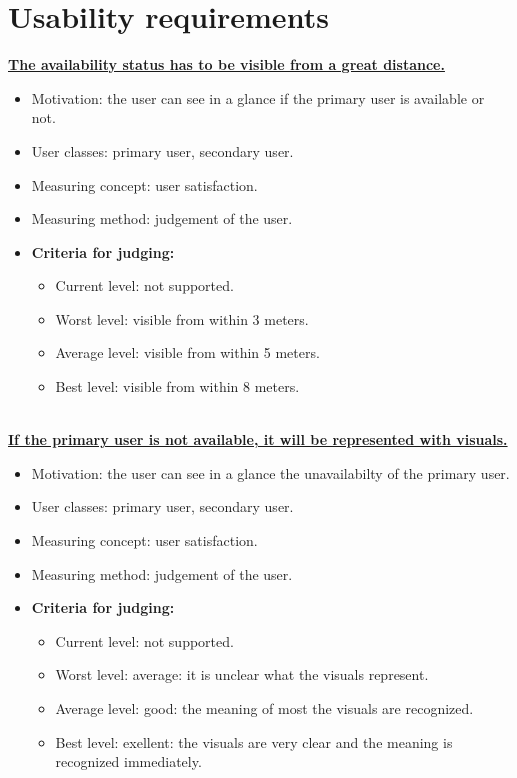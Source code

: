 \documentclass[11pt, a4paper,svglistings]{report}
\begin{document}
\section{Usability requirements}

\textbf{\underline{The availability status has to be visible from a great distance.}}
\begin{itemize}
\item{Motivation: the user can see in a glance if the primary user is available or not.}
\item{User classes: primary user, secondary user.}
\item{Measuring concept: user satisfaction.}
\item{Measuring method: judgement of the user.}
\item{\textbf{Criteria for judging:}}
\begin{itemize}
\item{Current level: not supported.}
\item{Worst level: visible from within 3 meters.}
\item{Average level: visible from within 5 meters.}
\item{Best level: visible from within 8 meters. \\ \\}
\end{itemize}
\end{itemize}
\textbf{\underline{If the primary user is not available, it will be represented with visuals.}}
\begin{itemize}
\item{Motivation: the user can see in a glance the unavailabilty of the primary user.}
\item{User classes: primary user, secondary user.}
\item{Measuring concept: user satisfaction.}
\item{Measuring method: judgement of the user.}
\item{\textbf{Criteria for judging:}}
\begin{itemize}
\item{Current level: not supported.}
\item{Worst level: average: it is unclear what the visuals represent.}
\item{Average level: good: the meaning of most the visuals are recognized.}
\item{Best level: exellent: the visuals are very clear and the meaning is recognized immediately. \\ \\}
\end{itemize}
\end{itemize}
\end{document}
